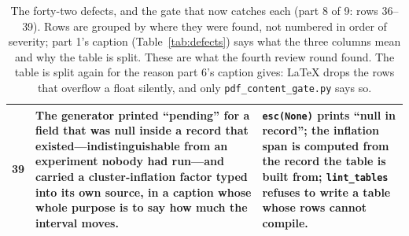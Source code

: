 \documentclass{article}
\begin{document}
\begin{table}[p]
\begin{tabular}{@{}p{0.6cm}p{7.3cm}p{7.3cm}@{}}
39 & The generator printed ``pending'' for a field that was null inside a record that existed---indistinguishable from an experiment nobody had run---and carried a cluster-inflation factor typed into its own source, in a caption whose whole purpose is to say how much the interval moves. & \texttt{esc(None)} prints ``null in record''; the inflation span is computed from the record the table is built from; \texttt{lint\_tables} refuses to write a table whose rows cannot compile. \\
\bottomrule
\end{tabular}
\caption{The forty-two defects, and the gate that now catches each (part 8 of 9: rows 36--39).  Rows are grouped by where they were found, not numbered in order of severity; part 1's caption (Table~\ref{tab:defects}) says what the three columns mean and why the table is split.  These are what the fourth review round found.  The table is split again for the reason part 6's caption gives: LaTeX drops the rows that overflow a float silently, and only \texttt{pdf\_content\_gate.py} says so.}
\label{tab:defectsh}
\end{table}
\end{document}
